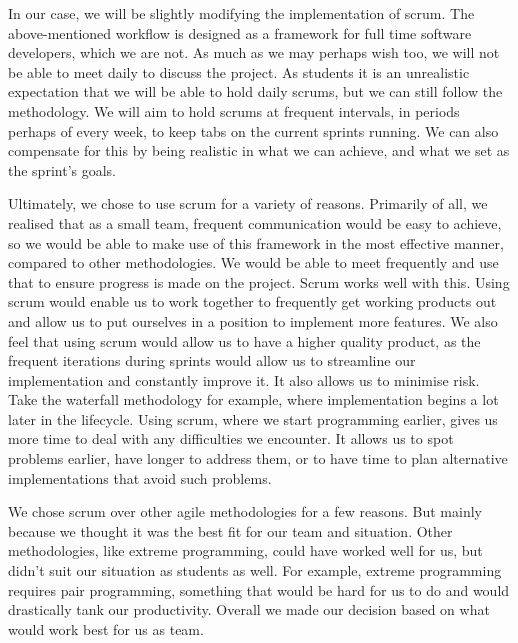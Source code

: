     In our case, we will be slightly modifying the implementation of scrum. The above-mentioned workflow is designed as
    a framework for full time software developers, which we are not. As much as we may perhaps wish too, we will not be
    able to meet daily to discuss the project. As students it is an unrealistic expectation that we will be able to hold
    daily scrums, but we can still follow the methodology. We will aim to hold scrums at frequent intervals, in periods
    perhaps of every week, to keep tabs on the current sprints running. We can also compensate for this by being
    realistic in what we can achieve, and what we set as the sprint’s goals.

    Ultimately, we chose to use scrum for a variety of reasons. Primarily of all, we realised that as a small team,
    frequent communication would be easy to achieve, so we would be able to make use of this framework in the most
    effective manner, compared to other methodologies. We would be able to meet frequently and use that to ensure
    progress is made on the project. Scrum works well with this. Using scrum would enable us to work together to
    frequently get working products out and allow us to put ourselves in a position to implement more features. We also
    feel that using scrum would allow us to have a higher quality product, as the frequent iterations during sprints
    would allow us to streamline our implementation and constantly improve it. It also allows us to minimise risk. Take
    the waterfall methodology for example, where implementation begins a lot later in the lifecycle. Using scrum, where
    we start programming earlier, gives us more time to deal with any difficulties we encounter. It allows us to spot
    problems earlier, have longer to address them, or to have time to plan alternative implementations that avoid such
    problems.

    We chose scrum over other agile methodologies for a few reasons. But mainly because we thought it was the best fit
    for our team and situation. Other methodologies, like extreme programming, could have worked well for us, but didn’t
    suit our situation as students as well. For example, extreme programming requires pair programming, something that
    would be hard for us to do and would drastically tank our productivity. Overall we made our decision based on what
    would work best for us as  team.

